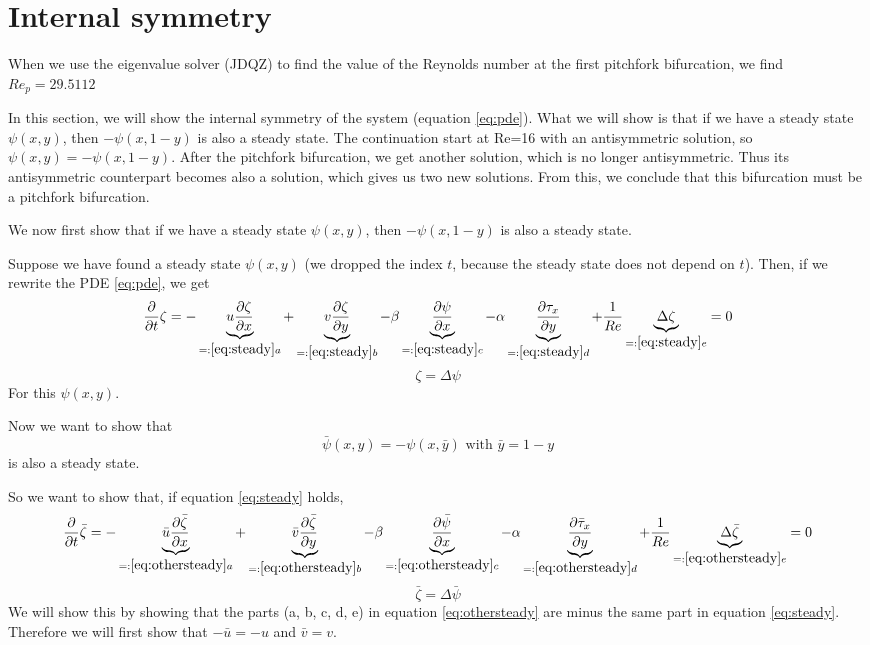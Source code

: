 \section{Internal symmetry}
When we use the eigenvalue solver (JDQZ) to find the value of the Reynolds number at the first pitchfork bifurcation, we find $Re_p=29.5112$

In this section, we will show the internal symmetry of the system (equation \ref{eq:pde}). What we will show is that if we have a steady state $\psi(x,y)$, then $-\psi(x,1-y)$ is also a steady state. The continuation start at Re=16 with an antisymmetric solution, so $\psi(x,y)=-\psi(x,1-y)$. After the pitchfork bifurcation, we get another solution, which is no longer antisymmetric. Thus its antisymmetric counterpart becomes also a solution, which gives us two new solutions. From this, we conclude that this bifurcation must be a pitchfork bifurcation.
 
 We now first show that if we have a steady state $\psi(x,y)$, then $-\psi(x,1-y)$ is also a steady state.
 
Suppose we have found a steady state $\psi(x,y)$ (we dropped the index $t$, because the steady state does not depend on $t$). Then, if we rewrite the PDE \ref{eq:pde}, we get
 \begin{equation}
   \frac{\partial}{\partial t}\zeta= - \underbrace{   u \frac{\partial\zeta}{\partial x}}_{=:\ref{eq:steady} a} +\underbrace{  v \frac{\partial\zeta}{\partial y}}_{=:\ref{eq:steady}b} - \beta \underbrace{\frac{\partial \psi}{\partial x} }_{=:\ref{eq:steady}c} - \alpha\underbrace{ \frac{\partial \tau_x}{\partial y}}_{=:\ref{eq:steady} d} +\frac{1}{Re}  \underbrace{\Delta \zeta}_{=:\ref{eq:steady}e}=0\label{eq:steady}
\end{equation}
 $$\zeta=\Delta \psi $$
For this $\psi(x,y)$.

Now we want to show that 
$$\bar{\psi}(x,y)=-\psi(x,\bar{y}) \text{ with }\bar{y}=1-y$$
is also a steady state.

So we want to show that, if equation \ref{eq:steady} holds, 
 \begin{equation} \frac{\partial}{\partial t}\bar{\zeta}=- \underbrace{  \bar u \frac{\partial\bar{\zeta}}{\partial x}}_{=:\ref{eq:othersteady} a} +\underbrace{ \bar v \frac{\partial\bar{\zeta}}{\partial y}}_{=:\ref{eq:othersteady}b} -\beta \underbrace{ \frac{\partial \bar{\psi}}{\partial x} }_{=:\ref{eq:othersteady}c} -\alpha  \underbrace{\frac{\partial \bar \tau_x}{\partial y}}_{=:\ref{eq:othersteady}d} + \frac{1}{Re} \underbrace{\Delta \bar{\zeta}}_{=:\ref{eq:othersteady}e}=0 \label{eq:othersteady}
 \end{equation}
 $$\bar{\zeta}=\Delta \bar{\psi}$$ 
We will show this by showing that the parts (a, b, c, d, e) in equation \ref{eq:othersteady} are minus the same part in equation \ref{eq:steady}. Therefore we will first show that $-\bar{u}=-u$ and $\bar{v}=v$. 
 
